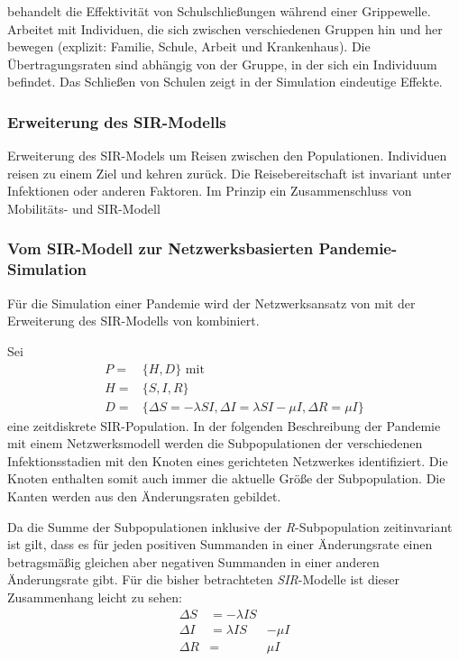 behandelt die Effektivität von Schulschließungen während einer Grippewelle. Arbeitet mit Individuen, die sich zwischen verschiedenen Gruppen hin und her bewegen (explizit: Familie, Schule, Arbeit und Krankenhaus). Die Übertragungsraten sind abhängig von der Gruppe, in der sich ein Individuum befindet. Das Schließen von Schulen zeigt in der Simulation eindeutige Effekte.
\subsubsection{Erweiterung des SIR-Modells}
\cite{Sattenspiel1995} Erweiterung des SIR-Models um Reisen zwischen den Populationen. Individuen reisen zu einem Ziel und kehren zurück. Die Reisebereitschaft ist invariant unter Infektionen oder anderen Faktoren. Im Prinzip ein Zusammenschluss von Mobilitäts- und SIR-Modell

\subsubsection{Vom SIR-Modell zur Netzwerksbasierten Pandemie-Simulation}
Für die Simulation einer Pandemie wird der Netzwerksansatz von \citep{Capasso1978} mit der Erweiterung des SIR-Modells von \citep{Sattenspiel1995} kombiniert. 

Sei 
\begin{align}
	P=&\lbrace H, D\rbrace \text{ mit}\label{eq:ssec:multiPop:SIRBegin}\\
	H=&\lbrace S, I, R\rbrace\\
	D=&\lbrace \Delta S= -\lambda SI, \Delta I = \lambda SI - \mu I, \Delta R = \mu I   \rbrace \label{eq:ssec:multiPop:SIREnd}
\end{align}
eine zeitdiskrete SIR-Population. In der folgenden Beschreibung der Pandemie mit einem Netzwerksmodell werden die Subpopulationen der verschiedenen Infektionsstadien mit den Knoten eines gerichteten Netzwerkes identifiziert. Die Knoten enthalten somit auch immer die aktuelle Größe der Subpopulation. Die Kanten werden aus den Änderungsraten gebildet. 

Da die Summe der Subpopulationen inklusive der \emph{R}-Subpopulation zeitinvariant ist gilt, dass es für jeden positiven Summanden in einer Änderungsrate einen betragsmäßig gleichen aber negativen Summanden in einer anderen Änderungsrate gibt. Für die bisher betrachteten \emph{SIR}-Modelle ist dieser Zusammenhang leicht zu sehen:
\begin{align}
	\Delta S & = -\lambda IS & \\
	\Delta I & = \lambda IS & - \mu I \\
	\Delta R & = & \mu I
\end{align}

